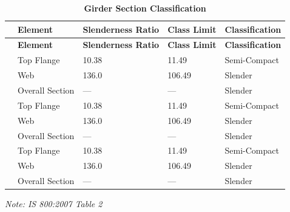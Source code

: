 \documentclass[12pt,a4paper]{report}
\numberwithin{table}{chapter}
\numberwithin{figure}{chapter}
\begin{document}
\vspace{1em}
\begin{longtable}{|C{2.5cm}|L{3cm}|C{3.5cm}|C{2.5cm}|>{\centering\arraybackslash}p{4.0cm}|}
\caption{\textbf{Girder Section Classification}}
\hline
\textbf{} & \textbf{Element} & \textbf{Slenderness Ratio} & \textbf{Class Limit} & \textbf{Classification} \\[6pt]
\hline
\endfirsthead

\hline
\textbf{} & \textbf{Element} & \textbf{Slenderness Ratio} & \textbf{Class Limit} & \textbf{Classification} \\[6pt]
\hline
\endhead
{} & Top Flange & 10.38 & 11.49 & Semi-Compact \\[6pt]
 & Web & 136.0 & 106.49 & Slender \\[6pt]
 & Overall Section & --- & --- & Slender \\[6pt]
\hline
{} & Top Flange & 10.38 & 11.49 & Semi-Compact \\[6pt]
 & Web & 136.0 & 106.49 & Slender \\[6pt]
 & Overall Section & --- & --- & Slender \\[6pt]
\hline
{} & Top Flange & 10.38 & 11.49 & Semi-Compact \\[6pt]
 & Web & 136.0 & 106.49 & Slender \\[6pt]
 & Overall Section & --- & --- & Slender \\[6pt]
\hline
\end{longtable}
\noindent\textit{Note: IS 800:2007 Table 2}
\end{document}
